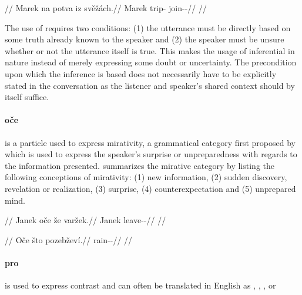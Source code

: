 \pex
\begingl
	\glpreamble {}//
	\gla Marek na potva iz svěžách.//
	\glb Marek \Loc{} trip-\Acc{} \Infer{} join-\Av{}-\Ctp{}//
	\glft {}//
\endgl
\xe

The use of  requires two conditions: (1) the utterance must be directly
based on some truth already known to the speaker and (2) the speaker must be
unsure whether or not the utterance itself is true. This makes the usage of
 inferential in nature instead of merely expressing some doubt or
uncertainty. The precondition upon which the inference is based does not
necessarily have to be explicitly stated in the conversation as the listener and
speaker's shared context should by itself suffice.

\paragraph{oče}  is a particle used to express
mirativity, a grammatical category first proposed by
\textcite{delancey1997mirativity} which is used to express the speaker's
surprise or unpreparedness with regards to the information presented.
\textcite{aikhenvald2012essence} summarizes the mirative category by listing the
following conceptions of mirativity: (1) new information, (2) sudden discovery,
revelation or realization, (3) surprise, (4) counterexpectation and (5)
unprepared mind.

\pex
\begingl
	\glpreamble {}//
	\gla Janek oče že varžek.//
	\glb Janek \Mir{} \Pfv{} leave-\Av{}-\Pf{}//
	\glft {}//
\endgl
\xe

\pex
\begingl
	\glpreamble {}//
	\gla Oče što pozebževí.//
	\glb \Mir{} \Aff{} rain-\Av{}-\Cont{}//
	\glft {}//
\endgl
{}%
\xe

\paragraph{pro}  is used to express contrast and can often be
translated in English as , , ,
 or 

